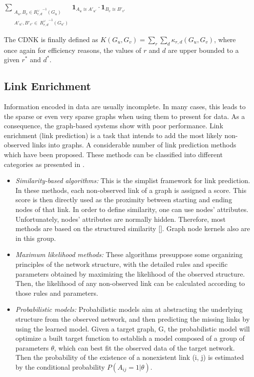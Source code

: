 \documentclass{article}
\begin{document}
\begin{flushright}
 $\sum\limits_{\substack {A_u,{B}_{v} \in {R_{r,d}^{\vee}}^{ -1}(G_u) \\
  A'_{u'},{B'}_{v'} \in \ {R_{r,d}^{\vee}}^{ -1}(G_{u'}) }} \!\!\!\!\!\!\!\!\!\!\!\!
  { \textbf{1}_{A_u \cong A'_{u'}} \cdot { \textbf{1}_{B_{v} \cong B'_{v'}}}}$
\end{flushright}

The CDNK is finally defined as $K(G_u,G_v) = \sum\limits_{r}{\sum\limits_{d}{\kappa_{r,d}(G_u,G_v)}}$, where once again for efficiency reasons, the values of $r$ and $d$ are upper bounded to a given $r^*$ and $d^*$.

\subsection{Link Enrichment}
\label{link-enrichment}
Information encoded in data are usually incomplete. In many cases, this leads to the sparse or even very sparse graphs when using them to present for data. As a consequence, the graph-based systems show with poor performance. Link enrichment (link prediction) is a task that intends to add the most likely non-observed links into graphs. A considerable number of link prediction methods which have been proposed. These methods can be classified into different categories as presented in \cite{?}. 
\begin{itemize}
\item \textit{Similarity-based algorithms:} This is the simplist framework for link prediction. In these methods, each non-observed link of a graph is assigned a score. This score is then directly used as the proximity between starting and ending nodes of that link. In order to define similarity, one can use nodes' attributes. Unfortunately, nodes' attributes are normally hidden. Therefore, most methods are based on the structured similarity [\cite{reference here}]. Graph node kernels also are in this group.

\item \textit{Maximum likelihood methods:} These algorithms presuppose some organizing principles of the network structure, with the detailed rules and specific parameters obtained by maximizing the likelihood of the observed structure. Then, the likelihood of any non-observed link can be calculated according to
those rules and parameters.

\item \textit{Probabilistic models:} Probabilistic models aim at abstracting the underlying structure from the observed network, and then predicting the missing links by using the learned model. Given a target graph, G, the probabilistic model will optimize a built target function to establish a model composed of a group of parameters $\theta$, which can best fit the observed data of the target network. Then the probability of the existence of a nonexistent link (i, j) is estimated by the conditional probability $P(A_{ij} = 1|\theta)$.

\end{itemize}
\end{document}
